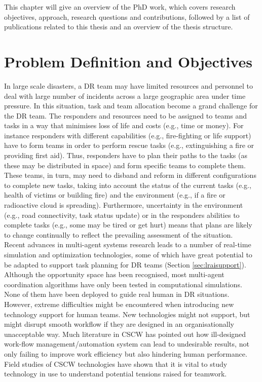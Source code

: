 This chapter will give an overview of the PhD work, which covers research objectives, approach, research questions and contributions, followed by a list of publications related to this thesis and an overview of the thesis structure.\\


\section{Problem Definition and Objectives}
In large scale disasters, a \ac{DR} team may have limited resources and personnel to deal with large number of incidents across a large geographic area under time pressure. In this situation, task and team allocation become a grand challenge for the \ac{DR} team. The responders and resources need to be assigned to teams and tasks in a way that minimises loss of life and costs (e.g., time or money). For instance responders with different capabilities (e.g., fire-fighting or life support) have to form teams in order to perform rescue tasks (e.g., extinguishing a fire or providing first aid). Thus, responders have to plan their paths to the tasks (as these may be distributed in space) and form specific teams to complete them. These teams, in turn, may need to disband and reform in different configurations to complete new tasks, taking into account the status of the current tasks (e.g., health of victims or building fire) and the environment (e.g., if a fire or radioactive cloud is spreading). Furthermore, uncertainty in the environment (e.g., road connectivity, task status update) or in the responders abilities to complete tasks (e.g., some may be tired or get hurt) means that plans are likely to change continually to reflect the prevailing assessment of the situation.\\

Recent advances in multi-agent systems research leads to a number of real-time simulation and optimization technologies, some of which have great potential to be adapted to support task planning for \ac{DR} teams (Section \ref{sec:lraisupport}). Although the opportunity space has been recognised, most multi-agent coordination algorithms have only been tested in computational simulations. None of them have been deployed to guide real human in \ac{DR} situations. However, extreme difficulties might be encountered when introducing new technology support for human teams. New technologies might not support, but might disrupt smooth workflow if they are designed in an organisationally unacceptable way. Much literature in \ac{CSCW} has pointed out how ill-designed work-flow management/automation system can lead to undesirable results, not only failing to improve work efficiency but also hindering human performance. Field studies of \ac{CSCW} technologies have shown that it is vital to study technology in use to understand potential tensions raised for teamwork. \\

